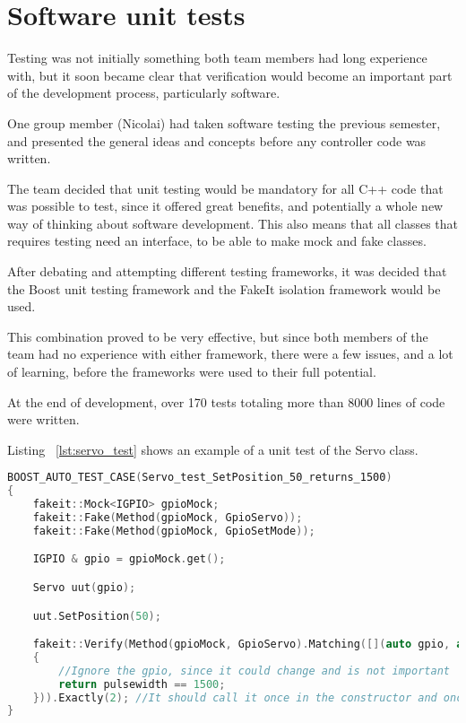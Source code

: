 \section{Software unit tests}
\label{sec:unit_test}

Testing was not initially something both team members had long experience with, but it soon became clear that verification would become an important part of the development process, particularly software. 

One group member (Nicolai) had taken software testing the previous semester, and presented the general ideas and concepts before any controller code was written. 

The team decided that unit testing would be mandatory for all C++ code that was possible to test, since it offered great benefits, and potentially a whole new way of thinking about software development. This also means that all classes that requires testing need an interface, to be able to make mock and fake classes.

After debating and attempting different testing frameworks, it was decided that the Boost unit testing framework and the FakeIt isolation framework would be used. 

This combination proved to be very effective, but since both members of the team had no experience with either framework, there were a few issues, and a lot of learning, before the frameworks were used to their full potential.

At the end of development, over 170 tests totaling more than 8000 lines of code were written. 

Listing ~\ref{lst:servo_test} shows an example of a unit test of the Servo class.

\begin{lstlisting}[caption = {Servo test of SetPosition}, captionpos=b, label={lst:servo_test}, language=C++,firstnumber=1]
BOOST_AUTO_TEST_CASE(Servo_test_SetPosition_50_returns_1500)
{
	fakeit::Mock<IGPIO> gpioMock;
	fakeit::Fake(Method(gpioMock, GpioServo));
	fakeit::Fake(Method(gpioMock, GpioSetMode));

	IGPIO & gpio = gpioMock.get();

	Servo uut(gpio);

	uut.SetPosition(50);

	fakeit::Verify(Method(gpioMock, GpioServo).Matching([](auto gpio, auto pulsewidth)
	{
		//Ignore the gpio, since it could change and is not important
		return pulsewidth == 1500;
	})).Exactly(2); //It should call it once in the constructor and once again when we set it.
}
\end{lstlisting}

